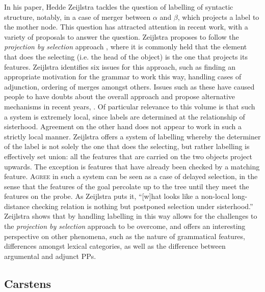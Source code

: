 \documentclass[output=paper
,modfonts
,nonflat]{langsci/langscibook}
\begin{document}
In his paper, Hedde Zeijlstra tackles the question of labelling of syntactic structure, notably, in a case of merger between $\alpha$ and $\beta$, which projects a label to the mother node.
This question has attracted attention in recent work, with a variety of proposals to answer the question.
Zeijlstra proposes to follow the \textit{projection by selection} approach \citep{Adger2003}, where it is commonly held that the element that does the selecting (i.e. the head of the object) is the one that projects its features.
Zeijlstra identifies six issues for this approach, such as finding an appropriate motivation for the grammar to work this way, handling cases of adjunction, ordering of merges amongst others.
Issues such as these have caused people to have doubts about the overall approach and propose alternative mechanisms in recent years, .
Of particular relevance to this volume is that such a system is extremely local, since labels are determined at the relationship of sisterhood.
Agreement on the other hand does not appear to work in such a strictly local manner.
Zeijlstra offers a system of labelling whereby the determiner of the label is not solely the one that does the selecting, but rather labelling is effectively set union: all the features that are carried on the two objects project upwards.
The exception is features that have already been checked by a matching feature.
\textsc{Agree} in such a system can be seen as a case of delayed selection, in the sense that the features of the goal percolate up to the tree until they meet the features on the probe.
As Zeijlstra puts it, ``[w]hat looks like a non-local long-distance checking relation is nothing but postponed selection under sisterhood.''
Zeijlstra shows that by handling labelling in this way allows for the challenges to the \textit{projection by selection} approach to be overcome, and offers an interesting perspective on other phenomena, such as the nature of grammatical features, differences amongst lexical categories, as well as the difference between argumental and adjunct PPs.

\subsection{Carstens}
\label{sec:carstens}
\end{document}
